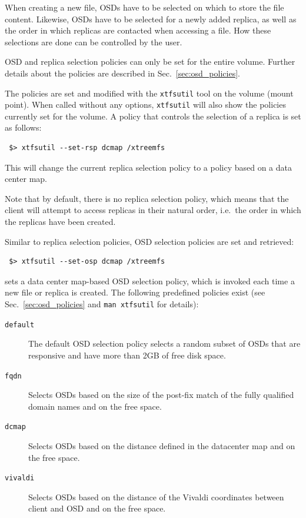 \documentclass[a4paper,10pt]{book}
\begin{document}
When creating a new file, OSDs have to be selected on which to store the file content. Likewise, OSDs have to be selected for a newly added replica, as well as the order in which replicas are contacted when accessing a file. How these selections are done can be controlled by the user.

OSD and replica selection policies can only be set for the entire volume. Further details about the policies are described in Sec.\ \ref{sec:osd_policies}.

The policies are set and modified with the \texttt{xtfsutil} tool on the volume (mount point). When called without any options, \texttt{xtfsutil} will also show the policies currently set for the volume. A policy that controls the selection of a replica is set as follows:

\begin{verbatim}
 $> xtfsutil --set-rsp dcmap /xtreemfs
\end{verbatim}

This will change the current replica selection policy to a policy based on a data center map.

Note that by default, there is no replica selection policy, which means that the client will attempt to access replicas in their natural order, i.e.\ the order in which the replicas have been created.

Similar to replica selection policies, OSD selection policies are set and retrieved:

\begin{verbatim}
 $> xtfsutil --set-osp dcmap /xtreemfs
\end{verbatim}

sets a data center map-based OSD selection policy, which is invoked each time a new file or replica is created. The following predefined policies exist (see Sec.\ \ref{sec:osd_policies} and \texttt{man xtfsutil} for details):

\begin{description}
 \item[\texttt{default}] The default OSD selection policy selects a random subset of OSDs that are responsive and have more than 2GB of free disk space.
 \item[\texttt{fqdn}] Selects OSDs based on the size of the post-fix match of the fully qualified domain names and on the free space.
 \item[\texttt{dcmap}] Selects OSDs based on the distance defined in the datacenter map and on the free space.
 \item[\texttt{vivaldi}] Selects OSDs based on the distance of the Vivaldi coordinates between client and OSD and on the free space.
\end{description}
\end{document}
